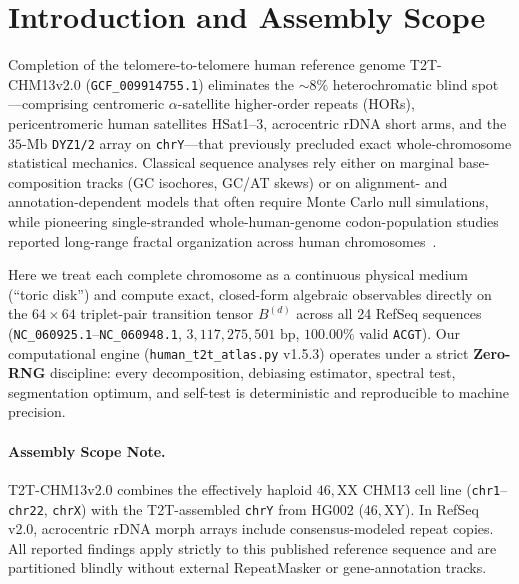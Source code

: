 \documentclass[11pt,a4paper]{article}
\begin{document}
\section{Introduction and Assembly Scope}
\label{sec:intro}

Completion of the telomere-to-telomere human reference genome T2T-CHM13v2.0 (\texttt{GCF\_009914755.1}) eliminates the $\sim 8\%$ heterochromatic blind spot---comprising centromeric $\alpha$-satellite higher-order repeats (HORs), pericentromeric human satellites HSat1--3, acrocentric rDNA short arms, and the $35\text{-Mb}$ \texttt{DYZ1/2} array on \texttt{chrY}---that previously precluded exact whole-chromosome statistical mechanics. Classical sequence analyses rely either on marginal base-composition tracks (GC isochores, GC/AT skews) or on alignment- and annotation-dependent models that often require Monte Carlo null simulations, while pioneering single-stranded whole-human-genome codon-population studies reported long-range fractal organization across human chromosomes~\cite{Perez2010}.

Here we treat each complete chromosome as a continuous physical medium (``toric disk'') and compute exact, closed-form algebraic observables directly on the $64\times 64$ triplet-pair transition tensor $B^{(d)}$ across all 24 RefSeq sequences (\texttt{NC\_060925.1}--\texttt{NC\_060948.1}, $3{,}117{,}275{,}501\text{ bp}$, $100.00\%$ valid \texttt{ACGT}). Our computational engine (\texttt{human\_t2t\_atlas.py} v1.5.3) operates under a strict \textbf{Zero-RNG} discipline: every decomposition, debiasing estimator, spectral test, segmentation optimum, and self-test is deterministic and reproducible to machine precision.

\paragraph{Assembly Scope Note.}
T2T-CHM13v2.0 combines the effectively haploid $46,\mathrm{XX}$ CHM13 cell line (\texttt{chr1}--\texttt{chr22}, \texttt{chrX}) with the T2T-assembled \texttt{chrY} from HG002 ($46,\mathrm{XY}$). In RefSeq v2.0, acrocentric rDNA morph arrays include consensus-modeled repeat copies. All reported findings apply strictly to this published reference sequence and are partitioned blindly without external RepeatMasker or gene-annotation tracks.
\end{document}
